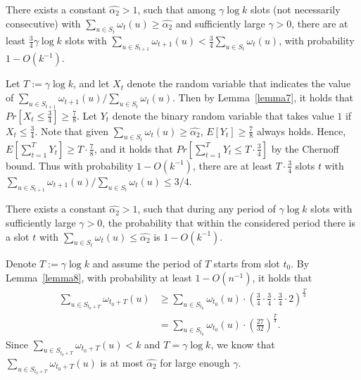 \begin{lemma}
    \label{lemma8}
    There exists a constant $\hat{\alpha_2} > 1$,
    such that among $\gamma\log k$ slots (not necessarily consecutive)
    with ${\sum}_{u\in S_t}\omega_t(u) \geq \hat{\alpha_2}$ and sufficiently
    large $\gamma > 0$, there are at least $\frac{3}{4}\gamma\log k$ slots
    with ${\sum}_{u\in S_{t+1}}\omega_{t+1}(u) < \frac{3}{4}{\sum}_{u\in S_t}\omega_t(u)$,
    with probability $1-O(k^{-1})$.
\end{lemma}

\begin{IEEEproof}
    Let $T := \gamma\log k$, and let $X_t$ denote the random variable that indicates the value of 
    ${\sum}_{u\in S_{t+1}}\omega_{t+1}(u) / {\sum}_{u\in S_t}\omega_t(u)$. Then
    by Lemma~\ref{lemma7}, it holds that $Pr[X_t \leq \frac{3}{4}] \geq \frac{7}{8}$.
    Let $Y_t$ denote the binary random variable that takes value $1$ if $X_t \leq \frac{3}{4}$.
    Note that given ${\sum}_{u\in S_t}\omega_t(u) \geq \hat{\alpha_2}$, $E[Y_t] \geq \frac{7}{8}$
    always holds. Hence, $E[\sum_{t=1}^{T}Y_t] \geq T\cdot\frac{7}{8}$, and it holds that
    $Pr[\sum_{t=1}^{T}Y_t\leq T\cdot\frac{3}{4}]$ by the Chernoff bound. Thus with probability 
    $1-O(k^{-1})$, there are at least $T\cdot\frac{3}{4}$ slots $t$ with 
    ${\sum}_{u\in S_{t+1}}\omega_{t+1}(u) / {\sum}_{u\in S_t}\omega_t(u) \leq 3/4$. 
\end{IEEEproof}

\begin{lemma}
    \label{lemma9}
    There exists a constant $\hat{\alpha_2} > 1$, such that
    during any period of $\gamma\log k$ slots with sufficiently large 
    $\gamma >0$, the probability that within the considered period there
    is a slot $t$ with ${\sum}_{u\in S_t}\omega_t(u) \leq \hat{\alpha_2}$
    is $1-O(k^{-1})$.
\end{lemma}

\begin{IEEEproof}
    Denote $T :=\gamma\log k$ and assume the period of $T$ starts from slot $t_0$.
    By Lemma~\ref{lemma8}, with probability at least $1-O(n^{-1})$, it holds that 
    \begin{align*}
        {\sum}_{u\in S_{t_0+T}}\omega_{t_0+T}(u)  &\geq 
        {\sum}_{u\in S_{t_0}}\omega_{t_0}(u)\cdot(\frac{3}{4}\cdot\frac{3}{4}
        \cdot\frac{3}{4}\cdot 2)^{\frac{T}{4}} \\
       &={\sum}_{u\in S_{t_0}}\omega_{t_0}(u)\cdot(\frac{27}{32})^{\frac{T}{4}}.
    \end{align*} 
    Since $\sum_{u\in S_{t_0+T}}\omega_{t_0+T}(u) < k$ and $T = \gamma\log k$,
    we know that $\sum_{u\in S_{t_0+T}}\omega_{t_0+T}(u)$ is at most $\hat{\alpha_2}$ 
    for large enough $\gamma$.
\end{IEEEproof}

